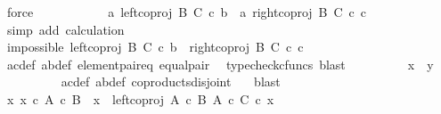 \begin{isabellebody}
\ force\isanewline
\ \ \ \ \ \ \ \ \isamarkupfalse%
\ \isamarkupfalse%
\ {\isachardoublequoteopen}{\isasymlangle}a{\isacharcomma}{\kern0pt}\ left{\isacharunderscore}{\kern0pt}coproj\ B\ C\ {\isasymcirc}\isactrlsub c\ b{\isasymrangle}\ {\isacharequal}{\kern0pt}\ {\isasymlangle}a{\isacharprime}{\kern0pt}{\isacharcomma}{\kern0pt}\ right{\isacharunderscore}{\kern0pt}coproj\ B\ C\ {\isasymcirc}\isactrlsub c\ c{\isacharprime}{\kern0pt}{\isasymrangle}{\isachardoublequoteclose}\isanewline
\ \ \ \ \ \ \ \ \ \ \isamarkupfalse%
\ {\isacharparenleft}{\kern0pt}simp\ add{\isacharcolon}{\kern0pt}\ calculation{\isacharparenright}{\kern0pt}\isanewline
\ \ \ \ \ \ \isamarkupfalse%
\ \ \ \ \ \ \ \ \isanewline
\ \ \ \ \ \ \isamarkupfalse%
\ \isamarkupfalse%
\ impossible{\isacharcolon}{\kern0pt}\ {\isachardoublequoteopen}left{\isacharunderscore}{\kern0pt}coproj\ B\ C\ {\isasymcirc}\isactrlsub c\ b\ {\isacharequal}{\kern0pt}\ right{\isacharunderscore}{\kern0pt}coproj\ B\ C\ {\isasymcirc}\isactrlsub c\ c{\isacharprime}{\kern0pt}{\isachardoublequoteclose}\isanewline
\ \ \ \ \ \ \ \ \isamarkupfalse%
\ a{\isacharprime}{\kern0pt}c{\isacharprime}{\kern0pt}{\isacharunderscore}{\kern0pt}def\ ab{\isacharunderscore}{\kern0pt}def\ element{\isacharunderscore}{\kern0pt}pair{\isacharunderscore}{\kern0pt}eq\ equal{\isacharunderscore}{\kern0pt}pair\ \isamarkupfalse%
\ {\isacharparenleft}{\kern0pt}typecheck{\isacharunderscore}{\kern0pt}cfuncs{\isacharcomma}{\kern0pt}\ blast{\isacharparenright}{\kern0pt}\isanewline
\ \ \ \ \ \ \isamarkupfalse%
\ \isamarkupfalse%
\ {\isachardoublequoteopen}x\ {\isacharequal}{\kern0pt}\ y{\isachardoublequoteclose}\isanewline
\ \ \ \ \ \ \ \ \isamarkupfalse%
\ a{\isacharprime}{\kern0pt}c{\isacharprime}{\kern0pt}{\isacharunderscore}{\kern0pt}def\ ab{\isacharunderscore}{\kern0pt}def\ coproducts{\isacharunderscore}{\kern0pt}disjoint\ \ \isamarkupfalse%
\ blast\isanewline
\ \ \ \ \isamarkupfalse%
\isanewline
\ \ \isamarkupfalse%
\isanewline
\ \ \ \ \isamarkupfalse%
\ {\isachardoublequoteopen}{\isasymnexists}x{\isacharprime}{\kern0pt}{\isachardot}{\kern0pt}\ x{\isacharprime}{\kern0pt}\ {\isasymin}\isactrlsub c\ A\ {\isasymtimes}\isactrlsub c\ B\ {\isasymand}\ x\ {\isacharequal}{\kern0pt}\ left{\isacharunderscore}{\kern0pt}coproj\ {\isacharparenleft}{\kern0pt}A\ {\isasymtimes}\isactrlsub c\ B{\isacharparenright}{\kern0pt}\ {\isacharparenleft}{\kern0pt}A\ {\isasymtimes}\isactrlsub c\ C{\isacharparenright}{\kern0pt}\ {\isasymcirc}\isactrlsub c\ x{\isacharprime}{\kern0pt}{\isachardoublequoteclose}\isanewline

\end{isabellebody}
